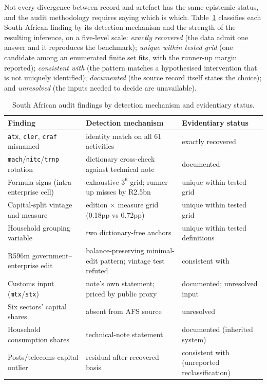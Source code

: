 Not every divergence between record and artefact has the same epistemic
status, and the audit methodology requires saying which is which.
Table~\ref{tab:evidence} classifies each South African finding by its
detection mechanism and the strength of the resulting inference, on a
five-level scale: \emph{exactly recovered} (the data admit one answer and
it reproduces the benchmark); \emph{unique within tested grid} (one
candidate among an enumerated finite set fits, with the runner-up margin
reported); \emph{consistent with} (the pattern matches a hypothesised
intervention that is not uniquely identified); \emph{documented} (the
source record itself states the choice); and \emph{unresolved} (the
inputs needed to decide are unavailable).

\begin{table}[h]
\centering\small
\begin{tabularx}{\textwidth}{lXl}
\toprule
Finding & Detection mechanism & Evidentiary status \\
\midrule
\texttt{atx}, \texttt{cler}, \texttt{craf} misnamed & identity match on
all 61 activities & exactly recovered \\
\texttt{mach}/\texttt{nitc}/\texttt{trnp} rotation & dictionary
cross-check against technical note & documented \\
Formula signs (intra-enterprise cell) & exhaustive $3^6$ grid; runner-up
misses by R2.5bn & unique within tested grid \\
Capital-split vintage and measure & edition $\times$ measure grid
(0.18pp vs 0.72pp) & unique within tested grid \\
Household grouping variable & two dictionary-free anchors &
unique within tested definitions \\
R596m government--enterprise edit & balance-preserving minimal-edit
pattern; vintage test refuted & consistent with \\
Customs input (\texttt{mtx}/\texttt{stx}) & note's own statement;
priced by public proxy & documented; unresolved input \\
Six sectors' capital shares & absent from AFS source & unresolved \\
Household consumption shares & technical-note statement & documented
(inherited system) \\
Posts/telecoms capital outlier & residual after recovered basis &
consistent with (unreported reclassification) \\
\bottomrule
\end{tabularx}
\caption{South African audit findings by detection mechanism and
evidentiary status.}
\label{tab:evidence}
\end{table}

